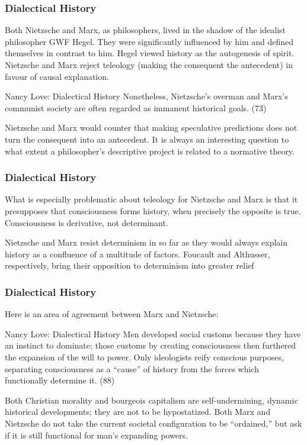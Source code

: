 \documentclass[xcolor=dvipsnames]{beamer}
\begin{document}
\begin{frame}
  \frametitle{Dialectical History}
  Both Nietzsche and Marx, as philosophers, lived in the shadow of the
  idealist philosopher GWF Hegel. They were significantly influenced
  by him and defined themselves in contrast to him. Hegel viewed
  history as the autogenesis of spirit. Nietzsche and Marx reject
  teleology (making the consequent the antecedent) in favour of causal
  explanation.
  \begin{block}{Nancy Love: Dialectical History}
    Nonetheless, Nietzsche's overman and Marx's communist society are
    often regarded as immanent historical goals. (73)
  \end{block}
  Nietzsche and Marx would counter that making speculative predictions
  does not turn the consequent into an antecedent. It is always an
  interesting question to what extent a philosopher's descriptive
  project is related to a normative theory.
\end{frame}

\begin{frame}
  \frametitle{Dialectical History}
  What is especially problematic about teleology for Nietzsche and
  Marx is that it presupposes that consciousness forms history, when
  precisely the opposite is true. Consciousness is derivative, not
  determinant.

  \bigskip

  Nietzsche and Marx resist determinism in so far as they would always
  explain history as a confluence of a multitude of factors. Foucault
  and Althusser, respectively, bring their opposition to determinism
  into greater relief
\end{frame}

\begin{frame}
  \frametitle{Dialectical History}
  Here is an area of agreement between Marx and Nietzsche:
  \begin{block}{Nancy Love: Dialectical History}
    Men developed social customs because they have an instinct to
    dominate; those customs by creating consciousness then furthered
    the expansion of the will to power. Only ideologists reify conscious
    purposes, separating consciousness as a ``cause'' of history from
    the forces which functionally determine it. (88)
  \end{block}
  Both Christian morality and bourgeois capitalism are
  self-undermining, dynamic historical developments; they are not
  to be hypostatized. Both Marx and Nietzsche do not take the current
  societal configuration to be ``ordained,'' but ask if it is still
  functional for man's expanding powers.
\end{frame}
\end{document}
